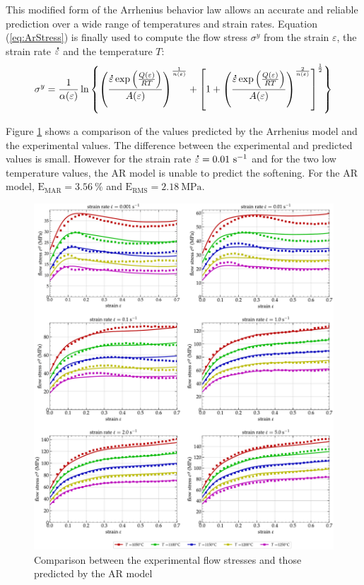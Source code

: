 \documentclass[metals,article,submit,pdftex,moreauthors]{Definitions/mdpi}
\DeclareRobustCommand{\mdot}[1]{\accentset{\mbox{\bfseries .}}{#1}}
\DeclareRobustCommand{\RMSE}{\text{E}_\text{RMS}}
\DeclareRobustCommand{\MARE}{\text{E}_\text{MAR}}
\DeclareRobustCommand{\ps}{\text{s}^{-1}}
\DeclareRobustCommand{\MPa}{\text{MPa}}
\begin{document}
This modified form of the Arrhenius behavior law allows an accurate and reliable prediction over a wide range of temperatures and strain rates.
Equation (\ref{eq:ArStress}) is finally used to compute the flow stress $\sigma^y$ from the strain $\varepsilon$, the strain rate $\mdot\varepsilon$ and the temperature $T$:
\begin{equation}
\sigma^y = \frac{1}{\alpha(\varepsilon)} \ln\left\{\left(\frac{\mdot\varepsilon \exp{\left(\frac{Q(\varepsilon)}{RT}\right)}}{A(\varepsilon)}\right)^{\frac{1}{n(\varepsilon)}} + \left[1 + \left(\frac{\mdot\varepsilon \exp{\left(\frac{Q(\varepsilon)}{RT}\right)}}{A(\varepsilon)}\right)^{\frac{2}{n(\varepsilon)}}\right]^{\frac{1}{2}}\right\}
\label{eq:ArStress}
\end{equation}

Figure \ref{fig:CompExp-AR-6} shows a comparison of the values predicted by the Arrhenius model and the experimental values.
The difference between the experimental and predicted values is small.
However for the strain rate $\mdot\varepsilon = 0.01~\ps$ and for the two low temperature values, the AR model is unable to predict the softening.
For the AR model, $\MARE=3.56~\%$ and $\RMSE=2.18~\MPa$.
\begin{figure}[!ht]
\centering
\includegraphics[width=\columnwidth]
{Figures/CompExp-AR-6}
\caption{Comparison between the experimental flow stresses and those predicted by the AR model}
\label{fig:CompExp-AR-6}
\end{figure}
\end{document}
